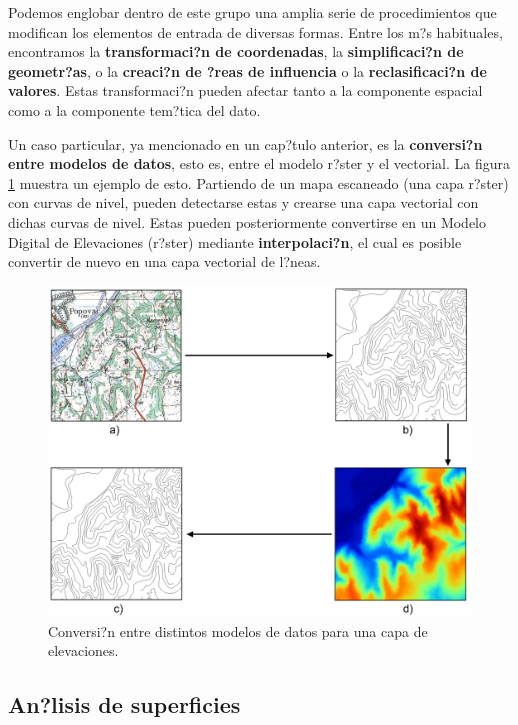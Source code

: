 Podemos englobar dentro de este grupo una amplia serie de procedimientos que modifican los elementos de entrada de diversas formas. Entre los m?s habituales, encontramos la \textbf{transformaci?n de coordenadas}, la \textbf{simplificaci?n de geometr?as}, o la \textbf{creaci?n de ?reas de influencia} o la \textbf{reclasificaci?n de valores}. Estas transformaci?n pueden afectar tanto a la componente espacial como a la componente tem?tica del dato. 

Un caso particular, ya mencionado en un cap?tulo anterior, es la \textbf{conversi?n entre modelos de datos}, esto es, entre el modelo r?ster y el vectorial. La figura \ref{Fig:Conversiones} muestra un ejemplo de esto. Partiendo de un mapa escaneado (una capa r?ster) con curvas de nivel, pueden detectarse estas y crearse una capa vectorial con dichas curvas de nivel. Estas pueden posteriormente convertirse en un Modelo Digital de Elevaciones (r?ster) mediante \textbf{interpolaci?n}, el cual es posible convertir de nuevo en una capa vectorial de l?neas.

\begin{figure}[!hbt]   
\centering
\includegraphics[width= \columnwidth]{../es/Analisis/Conversiones.png}
\caption{\small Conversi?n entre distintos modelos de datos para una capa de elevaciones.}
\label{Fig:Conversiones} 
\end{figure}

\subsection{An?lisis de superficies}

